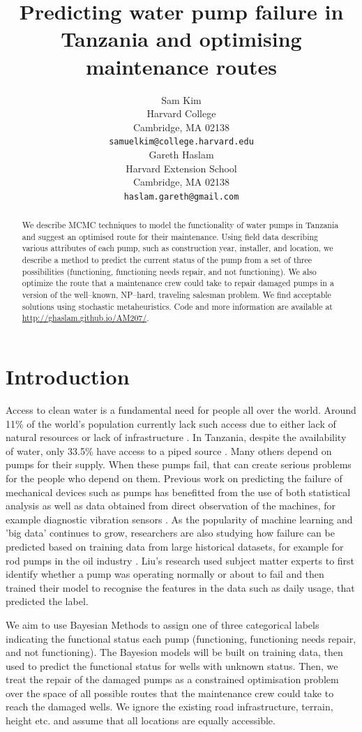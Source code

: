 \documentclass{article} %
\title{Predicting water pump failure in Tanzania and optimising maintenance routes}
\author{
Sam Kim \\
Harvard College\\
Cambridge, MA 02138 \\
\texttt{samuelkim@college.harvard.edu} \\
\And
Gareth Haslam \\
Harvard Extension School\\
Cambridge, MA 02138 \\
\texttt{haslam.gareth@gmail.com} \\
}
\begin{document}
\maketitle

\begin{abstract}
We describe MCMC techniques to model the functionality of water pumps in Tanzania and suggest an optimised route for their maintenance. Using field data describing various attributes of each pump, such as construction year, installer, and location, we describe a method to predict the current status of the pump from a set of three possibilities (functioning, functioning needs repair, and not functioning). We also optimize the route that a maintenance crew could take to repair damaged pumps in a version of the well--known, NP--hard, traveling salesman problem. We find acceptable solutions using stochastic metaheuristics. Code and more information are available at \url{http://ghaslam.github.io/AM207/}.
\end{abstract}

\section{Introduction}

Access to clean water is a fundamental need for people all over the world. Around 11\% of the world's population currently lack such access due to either lack of natural resources or lack of infrastructure \cite{UN2013}. In Tanzania, despite the availability of water, only 33.5\% have access to a piped source \cite{Morisset2012}. Many others depend on pumps for their supply. When these pumps fail, that can create serious problems for the people who depend on them. Previous work on predicting the failure of mechanical devices such as pumps has benefitted from the use of both statistical analysis as well as data obtained from direct observation of the machines, for example diagnostic vibration sensors \cite{Nakamura2007}. As the popularity of machine learning and 'big data' continues to grow, researchers are also studying how failure can be predicted based on training data from large historical datasets, for example for rod pumps in the oil industry \cite{Liu2013}. Liu's research used subject matter experts to first identify whether a pump was operating normally or about to fail and then trained their model to recognise the features in the data such as daily usage, that predicted the label. 

We aim to use Bayesian Methods to assign one of three categorical labels indicating the functional status each pump (functioning, functioning needs repair, and not functioning). The Bayesion models will be built on training data, then used to predict the functional status for wells with unknown status. Then, we treat the repair of the damaged pumps as a constrained optimisation problem over the space of all possible routes that the maintenance crew could take to reach the damaged wells. We ignore the existing road infrastructure, terrain, height etc. and assume that all locations are equally accessible. 
\end{document}
